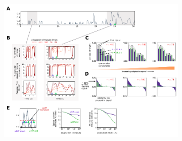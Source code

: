 


\begin{figure}[!tb]
	\begin{subfigure}[t]{\linewidth}
		{\includegraphics[width=\linewidth]{figures/Figures_temporal_coding}}
		\label{fig:temporal_coding_a}
	\end{subfigure}
	\begin{subfigure}[t]{0\linewidth}
		\label{fig:temporal_coding_b}
	\end{subfigure}
	\begin{subfigure}[t]{0\linewidth}
		\label{fig:temporal_coding_c}
	\end{subfigure}
	\begin{subfigure}[t]{0\linewidth}
		\label{fig:temporal_coding_d}
	\end{subfigure}
	\begin{subfigure}[t]{0\linewidth}
		\label{fig:temporal_coding_e}
	\end{subfigure}

\end{figure}
